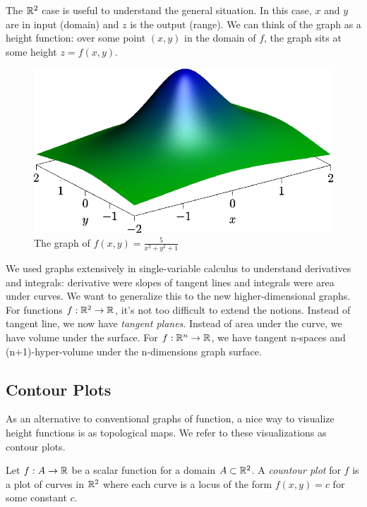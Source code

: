 \documentclass[fleqn,letterpaper]{report}
\begin{document}
The $\mathbb{R}^2$ case is useful to understand the general
situation. In this case, $x$ and $y$ are in input (domain)
and $z$ is the output (range). We can think of the graph as a
height function: over some point $(x,y)$ in the domain of $f$,
the graph sits at some height $z = f(x,y)$.

\begin{figure}[t]
\centering
\includegraphics[width=12cm]{figure37.eps}
\caption{The graph of $f(x,y) = \frac{5}{x^2 + y^2 + 1}$}
\label{figure-3d-graph1}
\end{figure}

We used graphs extensively in single-variable calculus to
understand derivatives and integrals: derivative were slopes
of tangent lines and integrals were area under curves. We want
to generalize this to the new higher-dimensional graphs.  For
functions $f:\mathbb{R}^2 \rightarrow \mathbb{R}$, it's not too difficult to
extend the notions. Instead of tangent line, we now have
\emph{tangent planes}. Instead of area under the curve, we
have volume under the surface.  For $f: \mathbb{R}^n \rightarrow
\mathbb{R}$, we have tangent n-spaces and (n+1)-hyper-volume under
the n-dimensions graph surface. 

\subsection{Contour Plots}
\label{contour-plots}

As an alternative to conventional graphs of function, a nice
way to visualize height functions is as topological maps. We
refer to these visualizations as contour plots. 

\begin{defn}
Let $f: A \rightarrow \mathbb{R}$ be a scalar function for a domain
$A \subset \mathbb{R}^2$. A \emph{countour plot} for $f$ is a plot
of curves in $\mathbb{R}^2$ where each curve is a locus of the form
$f(x,y) = c$ for some constant $c$.
\end{defn}
\end{document}
